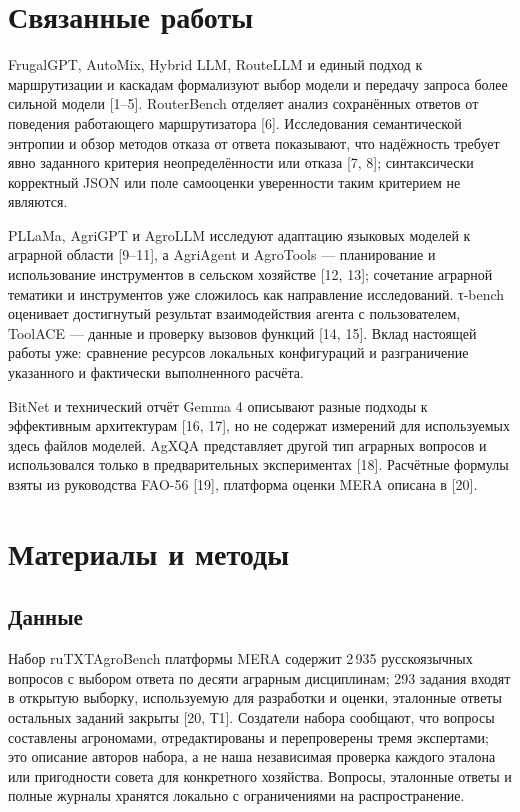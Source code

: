 \documentclass[14pt,a4paper]{extarticle}
\begin{document}
\section*{Связанные работы}
FrugalGPT, AutoMix, Hybrid LLM, RouteLLM и единый подход к маршрутизации и каскадам формализуют выбор модели и передачу запроса более сильной модели [1–5]. RouterBench отделяет анализ сохранённых ответов от поведения работающего маршрутизатора [6]. Исследования семантической энтропии и обзор методов отказа от ответа показывают, что надёжность требует явно заданного критерия неопределённости или отказа [7, 8]; синтаксически корректный JSON или поле самооценки уверенности таким критерием не являются.

PLLaMa, AgriGPT и AgroLLM исследуют адаптацию языковых моделей к аграрной области [9–11], а AgriAgent и AgroTools — планирование и использование инструментов в сельском хозяйстве [12, 13]; сочетание аграрной тематики и инструментов уже сложилось как направление исследований. τ-bench оценивает достигнутый результат взаимодействия агента с пользователем, ToolACE — данные и проверку вызовов функций [14, 15]. Вклад настоящей работы уже: сравнение ресурсов локальных конфигураций и разграничение указанного и фактически выполненного расчёта.

BitNet и технический отчёт Gemma 4 описывают разные подходы к эффективным архитектурам [16, 17], но не содержат измерений для используемых здесь файлов моделей. AgXQA представляет другой тип аграрных вопросов и использовался только в предварительных экспериментах [18]. Расчётные формулы взяты из руководства FAO-56 [19], платформа оценки MERA описана в [20].

\section*{Материалы и методы}
\subsection*{Данные}
Набор ruTXTAgroBench платформы MERA содержит 2\,935 русскоязычных вопросов с выбором ответа по десяти аграрным дисциплинам; 293 задания входят в открытую выборку, используемую для разработки и оценки, эталонные ответы остальных заданий закрыты [20, Т1]. Создатели набора сообщают, что вопросы составлены агрономами, отредактированы и перепроверены тремя экспертами; это описание авторов набора, а не наша независимая проверка каждого эталона или пригодности совета для конкретного хозяйства. Вопросы, эталонные ответы и полные журналы хранятся локально с ограничениями на распространение.
\end{document}
